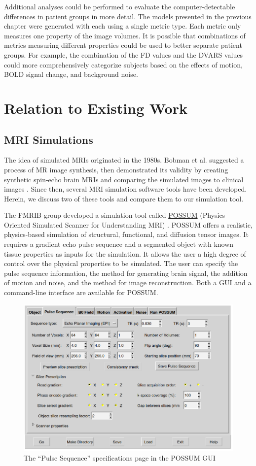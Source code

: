 Additional analyses could be performed to evaluate the computer-detectable differences in patient groups in more detail. The models presented in the previous chapter were generated with each using a single metric type. Each metric only measures one property of the image volumes. It is possible that combinations of metrics measuring different properties could be used to better separate patient groups. For example, the combination of the FD values and the DVARS values could more comprehensively categorize subjects based on the effects of motion, BOLD signal change, and background noise.

\section{Relation to Existing Work}

\subsection{MRI Simulations} 

The idea of simulated MRIs originated in the 1980s. Bobman et al. suggested a process of MR image synthesis, then demonstrated its validity by creating synthetic spin-echo brain MRIs and comparing the simulated images to clinical images \cite{Bobman1985}. Since then, several MRI simulation software tools have been developed. Herein, we discuss two of these tools and compare them to our simulation tool.

The FMRIB group developed a simulation tool called \href{https://fsl.fmrib.ox.ac.uk/fsl/fslwiki/POSSUM}{POSSUM} (Physics-Oriented Simulated Scanner for Understanding MRI) \cite{Drobnjak2006} \cite{Drobnjak2010}. POSSUM offers a realistic, physics-based simulation of structural, functional, and diffusion tensor images. It requires a gradient echo pulse sequence and a segmented object with known tissue properties as inputs for the simulation. It allows the user a high degree of control over the physical properties to be simulated. The user can specify the pulse sequence information, the method for generating brain signal, the addition of motion and noise, and the method for image reconstruction. Both a GUI and a command-line interface are available for POSSUM. 

\begin{figure}
\centering
\includegraphics[width=.6\textwidth]{7/possum-gui.png}
\caption{The ``Pulse Sequence'' specifications page in the POSSUM GUI}
\label{fig:possum}
\end{figure}

